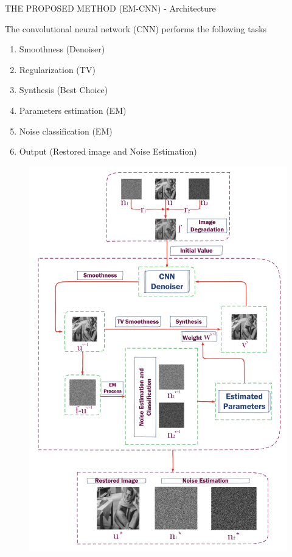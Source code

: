 \begin{frame}{THE PROPOSED METHOD (EM-CNN) - Architecture}
    \begin{minipage}{\linewidth}
        \centering
        \begin{minipage}{0.45\linewidth}
            The convolutional neural network (CNN) performs the following tasks            
            \begin{enumerate}
                \item Smoothness (Denoiser)
                \item Regularization (TV)
                \item Synthesis (Best Choice)
                \item Parameters estimation (EM)
                \item Noise classification (EM)
                \item Output (Restored image and Noise Estimation)
            \end{enumerate} 
        \end{minipage}
        \hspace{0.05\linewidth}
        \begin{minipage}{0.47\linewidth}
            \begin{figure}[h!]
                \centering
                \includegraphics[width = 1 \linewidth]{images/paper7/flowchart.png}

\end{figure}
\end{minipage}
\end{minipage}
\end{frame}
